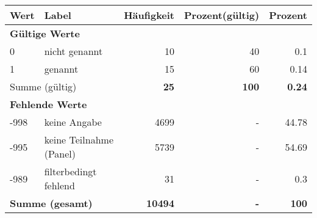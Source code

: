      \begin{longtable}{lXrrr}
     \toprule
     \textbf{Wert} & \textbf{Label} & \textbf{Häufigkeit} & \textbf{Prozent(gültig)} & \textbf{Prozent} \\
     \endhead
     \midrule
     \multicolumn{5}{l}{\textbf{Gültige Werte}}\\

     0 &
     \multicolumn{1}{X}{ nicht genannt   } &


       \num{10} &
       \num[round-mode=places,round-precision=2]{40} &
         \num[round-mode=places,round-precision=2]{0,1} \\

     1 &
     \multicolumn{1}{X}{ genannt   } &


       \num{15} &
       \num[round-mode=places,round-precision=2]{60} &
         \num[round-mode=places,round-precision=2]{0,14} \\
     \midrule
     \multicolumn{2}{l}{Summe (gültig)} &
       \textbf{\num{25}} &
     \textbf{100} &
       \textbf{\num[round-mode=places,round-precision=2]{0,24}} \\
     \multicolumn{5}{l}{\textbf{Fehlende Werte}}\\
       -998 &
       keine Angabe &
         \num{4699} &
        - &
         \num[round-mode=places,round-precision=2]{44,78} \\
       -995 &
       keine Teilnahme (Panel) &
         \num{5739} &
        - &
         \num[round-mode=places,round-precision=2]{54,69} \\
       -989 &
       filterbedingt fehlend &
         \num{31} &
        - &
         \num[round-mode=places,round-precision=2]{0,3} \\
     \midrule
     \multicolumn{2}{l}{\textbf{Summe (gesamt)}} &
          \textbf{\num{10494}} &
        \textbf{-} &
        \textbf{100} \\
     \bottomrule
     \end{longtable}
     
